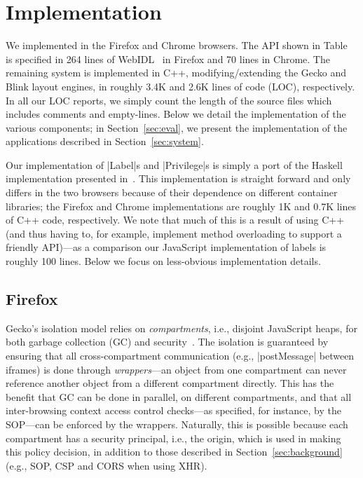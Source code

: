 \section{Implementation}
\label{sec:implementation}

We implemented \sys{} in the Firefox and Chrome browsers.
%
The API shown in Table~ is specified in 264
lines of WebIDL~\cite{webidl} in Firefox and 70 lines in Chrome.
%
The remaining system is implemented in C++, modifying/extending the Gecko and
Blink layout engines, in roughly 3.4K and 2.6K lines of code (LOC),
respectively.
%
In all our LOC reports, we simply count the length of the source files which
includes comments and empty-lines.
%
Below we detail the implementation of the various \sys{} components;
in Section~\ref{sec:eval}, we present the implementation of the
applications described in Section~\ref{sec:system}.

%
Our implementation of \js|Label|s and \js|Privilege|s is simply a port
of the Haskell implementation presented
in~\cite{stefan:2011:dclabels,stefan:2011:flexible}. 
%
This implementation is straight forward and only differs in the two
browsers because of their dependence on different container libraries;
the Firefox and Chrome implementations are roughly 1K and 0.7K
lines of C++ code, respectively.
%
We note that much of this is a result of using C++ (and thus having
to, for example, implement method overloading to support a friendly
API)---as a comparison our JavaScript implementation of labels is
roughly 100 lines. 
%
Below we focus on less-obvious implementation details.
%

\subsection{Firefox}
\label{sec:implementation:firefox}

Gecko's isolation model relies on \emph{compartments}, i.e., disjoint
JavaScript heaps, for both garbage collection (GC) and
security~\cite{wagner2011compartmental}.
%
The isolation is guaranteed by ensuring that all cross-compartment
communication (e.g., \js|postMessage| between iframes) is done through
\emph{wrappers}---an object from one compartment can never reference
another object from a different compartment directly.
%
This has the benefit that GC can be done in parallel, on different compartments,
and that all inter-browsing context access control checks---as specified, for
instance, by the SOP---can be enforced by the wrappers.
%
Naturally, this is possible because each compartment has a security
principal, i.e., the origin, which is used in making this policy
decision, in addition to those described in
Section~\ref{sec:background} (e.g., SOP, CSP and CORS when using XHR).


